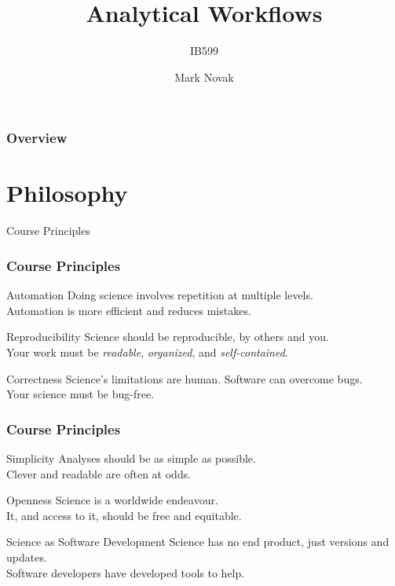 \documentclass{beamer}
\title[Analytical Workflows] %
{Analytical Workflows}
\subtitle{IB599}
\author[] %
{Mark Novak}
\institute[OSU] %
{
  \inst{}%
  Dept. of Integrative Biology\\
  Oregon State University
}
\date[Fall2020] %
{}
\begin{document}
\frame{\titlepage}

\begin{frame}
    \frametitle{Overview}
    \tableofcontents
\end{frame}


\section{Philosophy}


\begin{frame}{Course Principles}

    \frametitle{Course Principles}

        \begin{block}{Automation}
            Doing science involves repetition at multiple levels.\\Automation is more efficient and reduces mistakes.
        \end{block}

        \begin{block}{Reproducibility}
            Science should be reproducible, by others and you.\\Your work must be \emph{readable}, \emph{organized}, and \emph{self-contained}.
        \end{block}

        \begin{block}{Correctness}
            Science's limitations are human. Software can overcome bugs.\\Your science must be bug-free.
        \end{block}

\end{frame}

\begin{frame}

    \frametitle{Course Principles}

        \begin{block}{Simplicity}
            Analyses should be as simple as possible.\\Clever and readable are often at odds.
        \end{block}

        \begin{block}{Openness}
            Science is a worldwide endeavour.\\It, and access to it, should be free and equitable.
        \end{block}

        \begin{block}{Science as Software Development}
            Science has no end product, just versions and updates.\\Software developers have developed tools to help.
        \end{block}

\end{frame}
\end{document}
